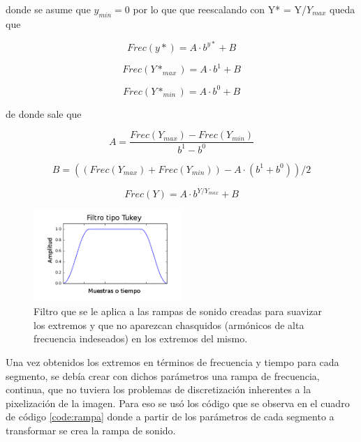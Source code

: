 \documentclass{article}
\numberwithin{figure}{section}
\begin{document}
    donde se asume que $y_{min}=0$ por lo que que reescalando con Y* = Y/$Y_{max}$ queda que
    
    \begin{equation*}
        Frec(y*) = A \cdot b^{y*} + B
    \end{equation*}
    
    \begin{equation*}
        Frec(Y*_{max}) = A \cdot b^{1} + B
    \end{equation*}
    
    \begin{equation*}
        Frec(Y*_{min}) = A \cdot b^{0} + B
    \end{equation*}
    
    de donde sale que 
    
    \begin{equation}
        \label{ec:yToF1}
        A = \frac{Frec(Y_{max}) - Frec(Y_{min}) }{b^1-b^0}
    \end{equation}
    
    \begin{equation}
        \label{ec:yToF2}
        B = ((Frec(Y_{max}) + Frec(Y_{min})) - A \cdot (b^1 + b^0)) / 2
    \end{equation}
    
    \begin{equation}
        \label{ec:yToF3}
        Frec(Y) = A \cdot b^{Y/Y_{max}} + B
    \end{equation}
    
    \begin{figure}
        \center
        \includegraphics[width=0.5\textwidth]{Imagenes/tukey.png}
        \caption{Filtro que se le aplica a las rampas de sonido creadas para suavizar los extremos y que no aparezcan chasquidos (armónicos de alta frecuencia indeseados) en los extremos del mismo.}
        \label{fig:tukey}
    \end{figure}
    
    Una vez obtenidos los extremos en términos de frecuencia y tiempo para cada segmento, se debía crear con dichos parámetros una rampa de frecuencia, continua, que no tuviera los problemas de discretización inherentes a la pixelización de la imagen. Para eso se usó los código que se observa en el cuadro de código \ref{code:rampa} donde a partir de los parámetros de cada segmento a transformar se crea la rampa de sonido.
    
\end{document}
